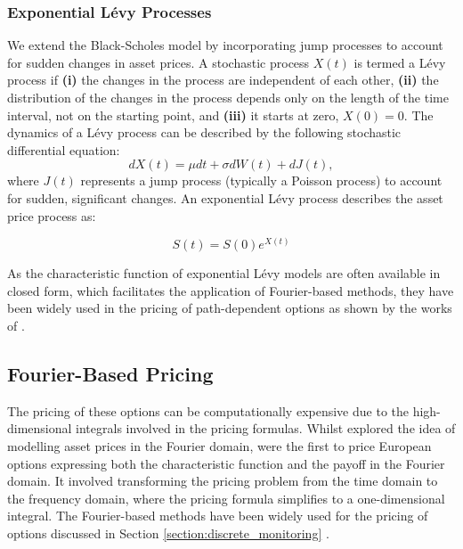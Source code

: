 \documentclass[a4paper]{report}
\begin{document}
\subsubsection{Exponential L\'evy Processes}
We extend the Black-Scholes model by incorporating jump processes to account for sudden changes in asset prices. A stochastic process $X(t)$ is termed a L\'evy process if \textbf{(i)} the changes in the process are independent of each other, \textbf{(ii)} the distribution of the changes in the process depends only on the length of the time interval, not on the starting point, and \textbf{(iii)} it starts at zero, $X(0) = 0$. The dynamics of a L\'evy process can be described by the following stochastic differential equation:
\begin{equation}
dX(t) = \mu dt + \sigma dW(t) + dJ(t),
\end{equation}
where $J(t)$ represents a jump process (typically a Poisson process) to account for sudden, significant changes. An exponential L\'evy process describes the asset price process as:

\begin{equation}
S(t) = S(0)e^{X(t)}	
\end{equation}

As the characteristic function of exponential L\'evy models are often available in closed form, which facilitates the application of Fourier-based methods, they have been widely used in the pricing of path-dependent options as shown by the works of \citet{fusai2016spitzer, kwok2011efficient, feng2008pricing, phelan2019hilbert}.

\subsection{Fourier-Based Pricing}
The pricing of these options can be computationally expensive due to the high-dimensional integrals involved in the pricing formulas. Whilst \citet{heston1993closed} explored the idea of modelling asset prices in the Fourier domain, \citet{carr1999option} were the first to price European options expressing both the characteristic function and the payoff in the Fourier domain. It involved transforming the pricing problem from the time domain to the frequency domain, where the pricing formula simplifies to a one-dimensional integral. The Fourier-based methods have been widely used for the pricing of options discussed in Section \ref{section:discrete_monitoring} \citep{eberlein2010analysis}.
\end{document}
